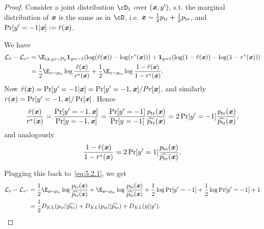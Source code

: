 \begin{proof}
Consider a joint distribution $\cD_1$ over $(\boldsymbol{\mathit{x}}, y')$, s.t. the marginal distribution of $\boldsymbol{\mathit{x}}$ is the same as in $\cD$, i.e. $\boldsymbol{\mathit{x}} \sim \frac{1}{2} p_{\mathrm{tr}} + \frac{1}{2} p_{\mathrm{te}}$, and $\Pr[y' = -1 | \boldsymbol{\mathit{x}}] := \hat{r}(\boldsymbol{\mathit{x}})$.


    We have
    \begin{align}
        \mathcal{L}_{\hat{r}} - \mathcal{L}_{r^*} & = \E_{(\xx,y) \sim \mathcal{D}_0} \mathbf{1}_{y=-1} (\log(\hat{r}(\xx)) - \log(r^*(\xx))) + \mathbf{1}_{y=1} ( \log(1 - \hat{r}(\xx)) - \log(1- r^*(\xx)))  \notag \\
        & = \frac{1}{2} \E_{x \sim \ptr} \log\frac{\hat{r}(\xx)}{r^*(\xx)} + \frac{1}{2} \E_{x\sim \pte} \log \frac{1-\hat{r}(\xx)}{1-r^*(\xx)}. \label{eq:5.2.1}
    \end{align}
    Now $\hat{r}(\boldsymbol{\mathit{x}}) = \Pr[y'=-1 | \boldsymbol{\mathit{x}}] = \Pr[y'=-1, \boldsymbol{\mathit{x}}] / Pr[\boldsymbol{\mathit{x}}]$, and similarly $r(\boldsymbol{\mathit{x}}) = \Pr[y'=-1, \boldsymbol{\mathit{x}}] / \Pr[\boldsymbol{\mathit{x}}]$. Hence \begin{equation*}
\frac{\hat{r}(\boldsymbol{\mathit{x}})}{r^*(\boldsymbol{\mathit{x}})} = \frac{\Pr[y'=-1, \boldsymbol{\mathit{x}}]}{\Pr[y=-1, \boldsymbol{\mathit{x}}]} = \frac{\Pr[y'=-1]}{\Pr[y=-1]}\frac{p_{\mathrm{tr}}(\boldsymbol{\mathit{x}})}{\widehat{p_{\mathrm{tr}}}(\boldsymbol{\mathit{x}})} = 2 \Pr[y'=-1] \frac{p_{\mathrm{tr}}(\boldsymbol{\mathit{x}})}{\widehat{p_{\mathrm{tr}}}(\boldsymbol{\mathit{x}})},
    \end{equation*}
    and analogously
    \begin{equation*}
        \frac{1- \hat{r}(\boldsymbol{\mathit{x}})}{1-r^*(\boldsymbol{\mathit{x}})} = 2 \Pr[y'=1] \frac{p_{\mathrm{te}}(\boldsymbol{\mathit{x}})}{\widehat{p_{\mathrm{te}}}(\boldsymbol{\mathit{x}})}.
    \end{equation*}

    Plugging this back to~\eqref{eq:5.2.1}, we get
    \begin{align*}
    \mathcal{L}_{\hat{r}} - \mathcal{L}_{r^*} & = \frac{1}{2} \E_{\xx \sim \ptr} \log \frac{\ptr(\xx)}{\widehat{\ptr}(\xx)} + \E_{\xx \sim \pte} \log \frac{\pte(\xx)}{\widehat{\pte}(\xx)} + \frac{1}{2} \log \Pr[y'=-1] + \frac{1}{2} \log \Pr[y'=-1] +1 \\
    & =
    \frac{1}{2} D_{KL}(\ptr || \widehat{\ptr}) + D_{KL}(\pte || \widehat{\pte}) + D_{KL}(y || y').
    \end{align*}
\end{proof}



